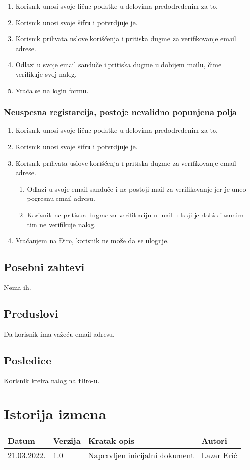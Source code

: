\documentclass[12pt]{article}
\begin{document}
\begin{enumerate}
   \item Korisnik unosi svoje lične podatke u delovima predodređenim za to.
   \item Korisnik unosi svoje šifru i potvrdjuje je.
   \item Korisnik prihvata uslove korišćenja i pritiska dugme za verifikovanje email adrese.
   \item Odlazi u svoje email sanduče i pritiska dugme u dobijem mailu, čime verifikuje svoj nalog.
   \item Vraća se na login formu.
 \end{enumerate}
 
\subsubsection{Neuspesna registarcija, postoje nevalidno popunjena polja}
\begin{enumerate}
   \item Korisnik unosi svoje lične podatke u delovima predodređenim za to.
   \item Korisnik unosi svoje šifru i potvrdjuje je.
   \item Korisnik prihvata uslove korišćenja i pritiska dugme za verifikovanje email adrese.
   \begin{enumerate}
   \item Odlazi u svoje email sanduče i ne postoji mail za verifikovanje jer je uneo pogresnu email adresu.
   \item Korisnik ne pritiska dugme za verifikaciju u mail-u koji je dobio i samim tim ne verifikuje nalog.
   \end{enumerate}
   \item Vraćanjem na Điro, korisnik ne može da se uloguje.
 \end{enumerate}

\subsection{Posebni zahtevi}
Nema ih.
\subsection{Preduslovi}
Da korisnik ima važeću email adresu.
\subsection{Posledice}
Korisnik kreira nalog na Điro-u.

\section{Istorija izmena}
\begin{center}
\begin{tabular}{ | m{2cm} | m{1.5cm}| m{6cm} | m{5cm} | } 
\hline
Datum & Verzija & Kratak opis & Autori \\ 
\hline
 21.03.2022. & 1.0 & Napravljen inicijalni dokument & Lazar Erić\\ 
\hline
&&&\\ 
\hline
\end{tabular}
\end{center}
\end{document}
